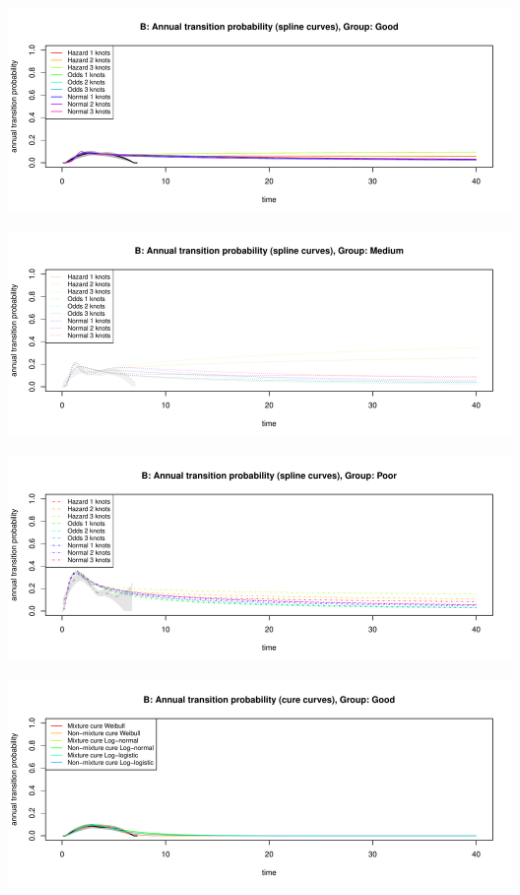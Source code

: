 \documentclass[
]{article}
\begin{document}
\begin{flushleft}\includegraphics[height=0.29\textheight]{BC_OS_output/Images/Figure_validate_extrapolation_tp-4} \end{flushleft}

\begin{flushleft}\includegraphics[height=0.29\textheight]{BC_OS_output/Images/Figure_validate_extrapolation_tp-5} \end{flushleft}

\begin{flushleft}\includegraphics[height=0.29\textheight]{BC_OS_output/Images/Figure_validate_extrapolation_tp-6} \end{flushleft}

\begin{flushleft}\includegraphics[height=0.29\textheight]{BC_OS_output/Images/Figure_validate_extrapolation_tp-7} \end{flushleft}
\end{document}
